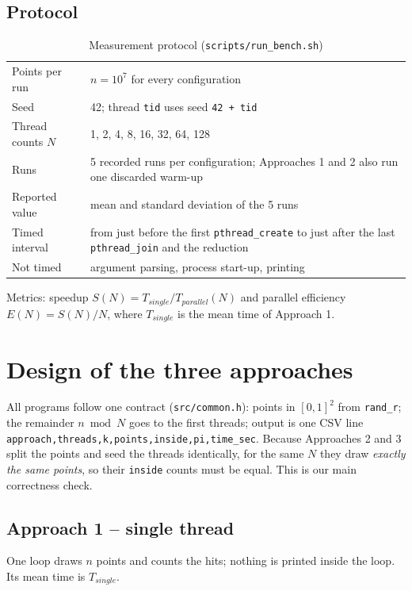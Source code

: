 \documentclass[11pt,a4paper]{article}
\newcommand{\code}[1]{\texttt{#1}}
\begin{document}
\subsection{Protocol}
\begin{table}[H]
\centering
\caption{Measurement protocol (\code{scripts/run\_bench.sh})}
\begin{tabularx}{\textwidth}{lX}
\toprule
Points per run & $n=10^7$ for every configuration \\
Seed & 42; thread \code{tid} uses seed \code{42 + tid} \\
Thread counts $N$ & 1, 2, 4, 8, 16, 32, 64, 128 \\
Runs & 5 recorded runs per configuration; Approaches 1 and 2 also run one discarded warm-up \\
Reported value & mean and standard deviation of the 5 runs \\
Timed interval & from just before the first \code{pthread\_create} to just after the last \code{pthread\_join} and the reduction \\
Not timed & argument parsing, process start-up, printing \\
\bottomrule
\end{tabularx}
\end{table}
Metrics: speedup $S(N)=T_{single}/T_{parallel}(N)$ and parallel efficiency $E(N)=S(N)/N$, where $T_{single}$ is the mean time of Approach 1.

\section{Design of the three approaches}
All programs follow one contract (\code{src/common.h}): points in $[0,1]^2$ from \code{rand\_r}; the remainder $n \bmod N$ goes to the first threads; output is one CSV line \code{approach,\allowbreak threads,\allowbreak k,\allowbreak points,\allowbreak inside,\allowbreak pi,\allowbreak time\_sec}. Because Approaches 2 and 3 split the points and seed the threads identically, for the same $N$ they draw \emph{exactly the same points}, so their \code{inside} counts must be equal. This is our main correctness check.

\subsection{Approach 1 -- single thread}
One loop draws $n$ points and counts the hits; nothing is printed inside the loop. Its mean time is $T_{single}$.
\end{document}
